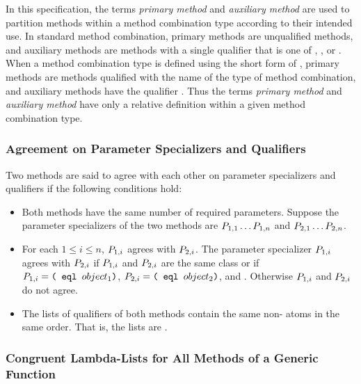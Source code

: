 In this specification, the terms \emph{primary method\/} and \emph{
auxiliary method\/} are used to partition methods within a method
combination type according to their intended use.  In standard method
combination, primary methods are unqualified methods, and auxiliary
methods are methods with a single qualifier that is one of 
, , or .  When a method combination
type is defined using the short form of 
, primary methods are methods qualified with
the name of the type of method combination, and auxiliary methods have
the qualifier .  Thus the terms \emph{primary method\/}
and \emph{auxiliary method\/} have only a relative definition within a
given method combination type.

\subsubsection{Agreement on Parameter Specializers and Qualifiers}
\label{Agreement-on-Parameter-Specializers-and-Qualifiers-SECTION}

Two methods are said to agree with each other on parameter specializers
and qualifiers if the following conditions hold:

\begin{itemize}

\item Both methods have the same number of required parameters.
Suppose the parameter specializers of the two methods are
$P_{1,1}\ldots P_{1,n}$
and $P_{2,1}\ldots P_{2,n}$.

\item For each $1\leq i\leq n$,
$P_{1,i}$ agrees with $P_{2,i}$.
The parameter specializer $P_{1,i}$
agrees with $P_{2,i}$ if
$P_{1,i}$ and $P_{2,i}$ are the same class or if 
$P\sub{1,i}=\texttt{(\cdf{eql} $object_1$)}$,
$P\sub{2,i}=\texttt{(\cdf{eql} $object_2$)}$, and
.
Otherwise $P_{1,i}$ and $P_{2,i}$ do not agree.


\item The lists of qualifiers of both methods contain the same 
non- atoms in the same order. That is, the lists are .

\end{itemize}


\subsubsection{Congruent Lambda-Lists for All Methods of a Generic Function}
\label{Congruent-Lambda-Lists-for-All-Methods-of-a-Generic-Function-SECTION}

